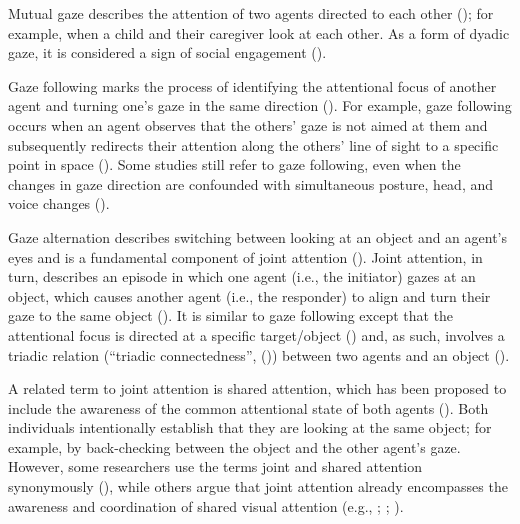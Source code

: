 \documentclass[
]{scrbook}
\begin{document}
Mutual gaze describes the attention of two agents directed to each other (); for example, when a child and their caregiver look at each other. As a form of dyadic gaze, it is considered a sign of social engagement ().

Gaze following marks the process of identifying the attentional focus of another agent and turning one's gaze in the same direction (). For example, gaze following occurs when an agent observes that the others' gaze is not aimed at them and subsequently redirects their attention along the others' line of sight to a specific point in space (). Some studies still refer to gaze following, even when the changes in gaze direction are confounded with simultaneous posture, head, and voice changes ().

Gaze alternation describes switching between looking at an object and an agent's eyes and is a fundamental component of joint attention (). Joint attention, in turn, describes an episode in which one agent (i.e., the initiator) gazes at an object, which causes another agent (i.e., the responder) to align and turn their gaze to the same object (). It is similar to gaze following except that the attentional focus is directed at a specific target/object () and, as such, involves a triadic relation (``triadic connectedness'', ()) between two agents and an object ().

A related term to joint attention is shared attention, which has been proposed to include the awareness of the common attentional state of both agents (). Both individuals intentionally establish that they are looking at the same object; for example, by back-checking between the object and the other agent's gaze. However, some researchers use the terms joint and shared attention synonymously (), while others argue that joint attention already encompasses the awareness and coordination of shared visual attention (e.g., ; ; ).
\end{document}
